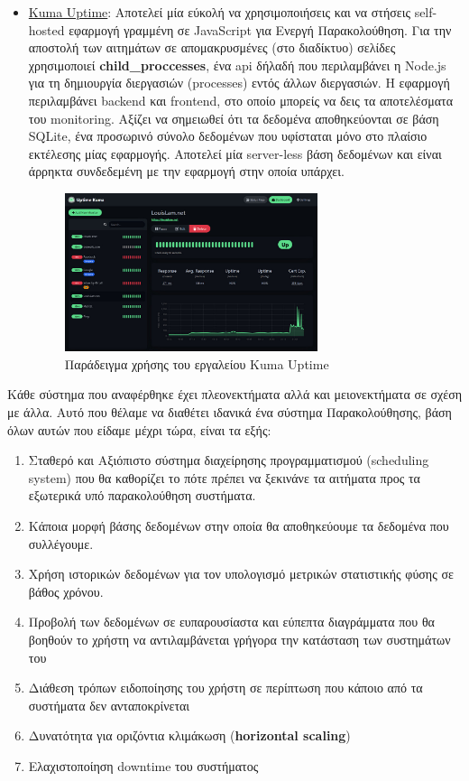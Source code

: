 \begin{itemize}
	\item \href{https://github.com/louislam/uptime-kuma}{Kuma Uptime}: Αποτελεί μία εύκολή να χρησιμοποιήσεις και να στήσεις
	      self-hosted εφαρμογή γραμμένη σε JavaScript για Ενεργή Παρακολούθηση. Για την αποστολή των αιτημάτων σε απομακρυσμένες (στο διαδίκτυο) σελίδες
	      χρησιμοποιεί \textbf{child\_proccesses}, ένα api δήλαδή που περιλαμβάνει η Node.js για τη δημιουργία διεργασιών (processes) εντός άλλων διεργασιών.
	      Η εφαρμογή περιλαμβάνει backend και frontend, στο οποίο μπορείς να δεις τα αποτελέσματα του monitoring. Αξίζει να σημειωθεί
	      ότι τα δεδομένα αποθηκεύονται σε βάση SQLite, ένα προσωρινό σύνολο δεδομένων που υφίσταται μόνο στο πλαίσιο εκτέλεσης μίας εφαρμογής.
	      Αποτελεί μία server-less βάση δεδομένων και είναι άρρηκτα συνδεδεμένη με την εφαρμογή στην οποία υπάρχει.
	      \begin{figure}[!ht]
		      \centering
		      \includegraphics[width=0.7\textwidth]{./images/chapter3/kuma-uptime.jpg}
		      \caption[Παράδειγμα χρήσης του εργαλείου Kuma Uptime]{Παράδειγμα χρήσης του εργαλείου Kuma Uptime}
		      \label{fig:kuma_uptime}
	      \end{figure}
\end{itemize}

Κάθε σύστημα που αναφέρθηκε έχει πλεονεκτήματα αλλά και μειονεκτήματα σε σχέση με άλλα.
Αυτό που θέλαμε να διαθέτει ιδανικά ένα σύστημα Παρακολούθησης, βάση όλων αυτών που είδαμε μέχρι τώρα,
είναι τα εξής:

\begin{enumerate}
	\item Σταθερό και Αξιόπιστο σύστημα διαχείρησης προγραμματισμού (scheduling system) που θα
		καθορίζει το πότε πρέπει να ξεκινάνε τα αιτήματα προς τα εξωτερικά υπό παρακολούθηση συστήματα.
	\item Κάποια μορφή βάσης δεδομένων στην οποία θα αποθηκεύουμε τα δεδομένα που συλλέγουμε.
	\item Χρήση ιστορικών δεδομένων για τον υπολογισμό μετρικών στατιστικής φύσης σε βάθος χρόνου.
	\item Προβολή των δεδομένων σε ευπαρουσίαστα και εύπεπτα διαγράμματα που θα βοηθούν το χρήστη να αντιλαμβάνεται
		γρήγορα την κατάσταση των συστημάτων του
	\item Διάθεση τρόπων ειδοποίησης του χρήστη σε περίπτωση που κάποιο από τα συστήματα δεν ανταποκρίνεται
	\item Δυνατότητα για οριζόντια κλιμάκωση (\textbf{horizontal scaling})
	\item Ελαχιστοποίηση downtime του συστήματος 
\end{enumerate}

